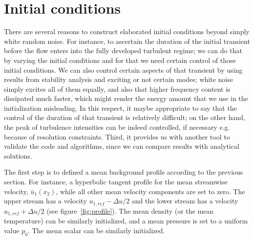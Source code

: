 \section{Initial conditions}

There are several reasons to construct elaborated initial conditions beyond simply white random noise. For instance, to ascertain the duration of the initial transient before the flow enters into the fully developed turbulent regime; we can do that by varying the initial conditions and for that we need certain control of those initial conditions. We can also control certain aspects of that transient by using results from stability analysis and exciting or not certain modes; white noise simply excites all of them equally, and also that higher frequency content is dissipated much faster, which might render the energy amount that we use in the initialization misleading. In this respect, it maybe appropriate to say that the control of the duration of that transient is relatively difficult; on the other hand, the peak of turbulence intensities can be indeed controlled, if necessary e.g. because of resolution constraints. Third, it provides us with another tool to validate the code and algorithms, since we can compare results with analytical solutions.

The first step is to defined a mean background profile according to the previous section. For instance, a hyperbolic tangent profile for the mean streamwise velocity, $\bar{u}_1(x_2)$, while all other mean velocity components are set to zero.  The upper stream has a velocity $u_{1,ref}-\Delta u/2$ and the lower stream has a velocity $u_{1,ref}+\Delta u/2$ (see figure~\ref{fig:profile}). The mean density (or the mean temperature) can be similarly initialized, and a mean pressure is set to a uniform value $p_0$. The mean scalar can be similarly initialized.

